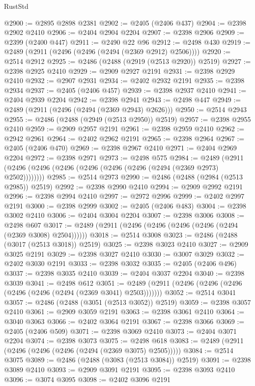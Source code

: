 \begin{lexlean}{RustStd}
\begin{coremodule}
{\begin{coremodule}
{{{{{{{{{{{{{{{{{{{{{{{{{{{{{{{{{{{{{{{{{{{{{{{{{{@2900 := @2895 @2898 @2381
@2902 := @2405 (@2406 @437)
@2904 := @2398 @2902 @2410
@2906 := @2404 @2904 @2204
@2907 := @2398 @2906
@2909 := @2399 (@2400 @447)
@2911 := @2490 @22 @96
@2912 := @2498 @430
@2919 := @2489 (@2911 (@2496 (@2496 (@2494 (@2369 @2912) @2506))))
@2920 := @2514 @2912
@2925 := @2486 (@2488 (@2919 (@2513 @2920)) @2519)
@2927 := @2398 @2925 @2410
@2929 := @2909 @2927 @2191
@2931 := @2398 @2929 @2410
@2932 := @2907 @2931
@2934 := @2402 @2932 @2191
@2935 := @2398 @2934
@2937 := @2405 (@2406 @457)
@2939 := @2398 @2937 @2410
@2941 := @2404 @2939 @2204
@2942 := @2398 @2941
@2943 := @2498 @447
@2949 := @2489 (@2911 (@2496 (@2494 (@2369 @2943) @2626)))
@2950 := @2514 @2943
@2955 := @2486 (@2488 (@2949 (@2513 @2950)) @2519)
@2957 := @2398 @2955 @2410
@2959 := @2909 @2957 @2191
@2961 := @2398 @2959 @2410
@2962 := @2942 @2961
@2964 := @2402 @2962 @2191
@2965 := @2398 @2964
@2967 := @2405 (@2406 @470)
@2969 := @2398 @2967 @2410
@2971 := @2404 @2969 @2204
@2972 := @2398 @2971
@2973 := @2498 @575
@2984 := @2489 (@2911 (@2496 (@2496 (@2496 (@2496 (@2496 (@2496 (@2494 (@2369 @2973) @2502))))))))
@2985 := @2514 @2973
@2990 := @2486 (@2488 (@2984 (@2513 @2985)) @2519)
@2992 := @2398 @2990 @2410
@2994 := @2909 @2992 @2191
@2996 := @2398 @2994 @2410
@2997 := @2972 @2996
@2999 := @2402 @2997 @2191
@3000 := @2398 @2999
@3002 := @2405 (@2406 @483)
@3004 := @2398 @3002 @2410
@3006 := @2404 @3004 @2204
@3007 := @2398 @3006
@3008 := @2498 @607
@3017 := @2489 (@2911 (@2496 (@2496 (@2496 (@2496 (@2494 (@2369 @3008) @2504))))))
@3018 := @2514 @3008
@3023 := @2486 (@2488 (@3017 (@2513 @3018)) @2519)
@3025 := @2398 @3023 @2410
@3027 := @2909 @3025 @2191
@3029 := @2398 @3027 @2410
@3030 := @3007 @3029
@3032 := @2402 @3030 @2191
@3033 := @2398 @3032
@3035 := @2405 (@2406 @496)
@3037 := @2398 @3035 @2410
@3039 := @2404 @3037 @2204
@3040 := @2398 @3039
@3041 := @2498 @612
@3051 := @2489 (@2911 (@2496 (@2496 (@2496 (@2496 (@2496 (@2494 (@2369 @3041) @2503)))))))
@3052 := @2514 @3041
@3057 := @2486 (@2488 (@3051 (@2513 @3052)) @2519)
@3059 := @2398 @3057 @2410
@3061 := @2909 @3059 @2191
@3063 := @2398 @3061 @2410
@3064 := @3040 @3063
@3066 := @2402 @3064 @2191
@3067 := @2398 @3066
@3069 := @2405 (@2406 @509)
@3071 := @2398 @3069 @2410
@3073 := @2404 @3071 @2204
@3074 := @2398 @3073
@3075 := @2498 @618
@3083 := @2489 (@2911 (@2496 (@2496 (@2496 (@2494 (@2369 @3075) @2505)))))
@3084 := @2514 @3075
@3089 := @2486 (@2488 (@3083 (@2513 @3084)) @2519)
@3091 := @2398 @3089 @2410
@3093 := @2909 @3091 @2191
@3095 := @2398 @3093 @2410
@3096 := @3074 @3095
@3098 := @2402 @3096 @2191
}}}}}}}}}}}}}}}}}}}}}}}}}}}}}}}}}}}}}}}}}}}}}}}}}}
\end{coremodule}}
\end{coremodule}
\end{lexlean}
